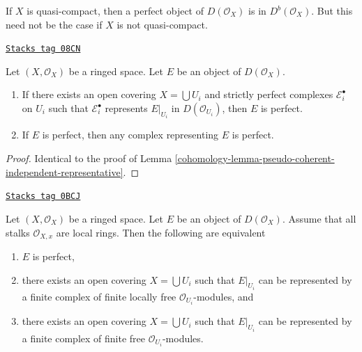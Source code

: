 If $X$ is quasi-compact, then a perfect object of $D(\mathcal{O}_X)$
is in $D^b(\mathcal{O}_X)$. But this need not be the case if
$X$ is not quasi-compact.

\begin{lemma}
\label{cohomology-lemma-perfect-independent-representative}
\href{https://stacks.math.columbia.edu/tag/08CN}{\texttt{Stacks tag 08CN}}

Let $(X, \mathcal{O}_X)$ be a ringed space.
Let $E$ be an object of $D(\mathcal{O}_X)$.
\begin{enumerate}
\item If there exists an open covering $X = \bigcup U_i$ and
strictly perfect complexes $\mathcal{E}_i^\bullet$ on $U_i$
such that $\mathcal{E}_i^\bullet$ represents $E|_{U_i}$ in
$D(\mathcal{O}_{U_i})$, then $E$ is perfect.
\item If $E$ is perfect, then any complex representing $E$ is perfect.
\end{enumerate}
\end{lemma}

\begin{proof}

Identical to the proof of
Lemma \ref{cohomology-lemma-pseudo-coherent-independent-representative}.
\end{proof}

\begin{lemma}
\label{cohomology-lemma-perfect-on-locally-ringed}
\href{https://stacks.math.columbia.edu/tag/0BCJ}{\texttt{Stacks tag 0BCJ}}

Let $(X, \mathcal{O}_X)$ be a ringed space. Let $E$ be an object of
$D(\mathcal{O}_X)$. Assume that all stalks $\mathcal{O}_{X, x}$
are local rings. Then the following are equivalent
\begin{enumerate}
\item $E$ is perfect,
\item there exists an open covering $X = \bigcup U_i$ such that
$E|_{U_i}$ can be represented by a finite complex of finite locally
free $\mathcal{O}_{U_i}$-modules, and
\item there exists an open covering $X = \bigcup U_i$ such that
$E|_{U_i}$ can be represented by a finite complex of finite
free $\mathcal{O}_{U_i}$-modules.
\end{enumerate}
\end{lemma}

